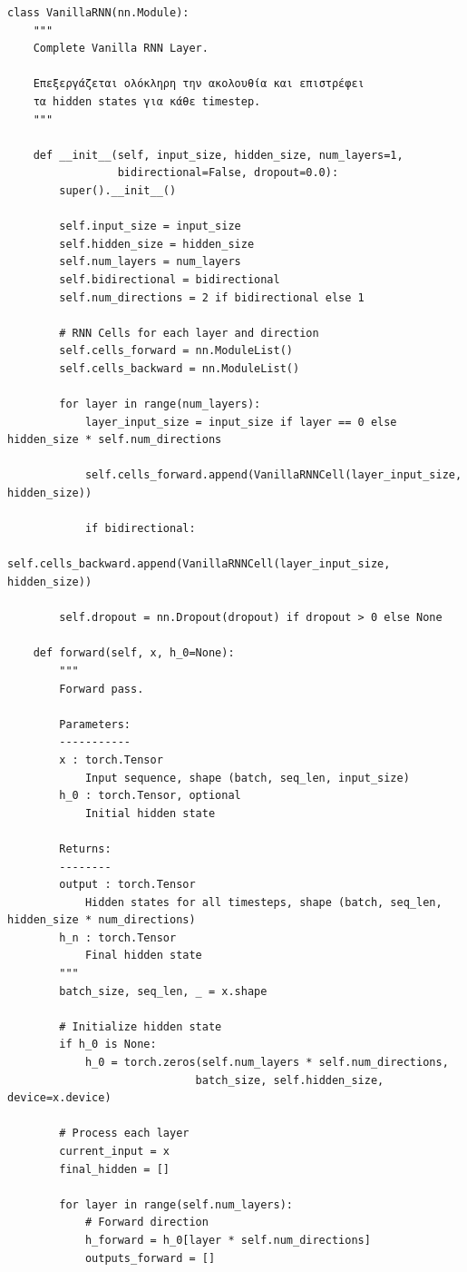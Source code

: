 \begin{lstlisting}
class VanillaRNN(nn.Module):
    """
    Complete Vanilla RNN Layer.
 
    Επεξεργάζεται ολόκληρη την ακολουθία και επιστρέφει
    τα hidden states για κάθε timestep.
    """
 
    def __init__(self, input_size, hidden_size, num_layers=1,
                 bidirectional=False, dropout=0.0):
        super().__init__()
 
        self.input_size = input_size
        self.hidden_size = hidden_size
        self.num_layers = num_layers
        self.bidirectional = bidirectional
        self.num_directions = 2 if bidirectional else 1
 
        # RNN Cells for each layer and direction
        self.cells_forward = nn.ModuleList()
        self.cells_backward = nn.ModuleList()
 
        for layer in range(num_layers):
            layer_input_size = input_size if layer == 0 else hidden_size * self.num_directions
 
            self.cells_forward.append(VanillaRNNCell(layer_input_size, hidden_size))
 
            if bidirectional:
                self.cells_backward.append(VanillaRNNCell(layer_input_size, hidden_size))
 
        self.dropout = nn.Dropout(dropout) if dropout > 0 else None
 
    def forward(self, x, h_0=None):
        """
        Forward pass.
 
        Parameters:
        -----------
        x : torch.Tensor
            Input sequence, shape (batch, seq_len, input_size)
        h_0 : torch.Tensor, optional
            Initial hidden state
 
        Returns:
        --------
        output : torch.Tensor
            Hidden states for all timesteps, shape (batch, seq_len, hidden_size * num_directions)
        h_n : torch.Tensor
            Final hidden state
        """
        batch_size, seq_len, _ = x.shape
 
        # Initialize hidden state
        if h_0 is None:
            h_0 = torch.zeros(self.num_layers * self.num_directions,
                             batch_size, self.hidden_size, device=x.device)
 
        # Process each layer
        current_input = x
        final_hidden = []
 
        for layer in range(self.num_layers):
            # Forward direction
            h_forward = h_0[layer * self.num_directions]
            outputs_forward = []
 

\end{lstlisting}
